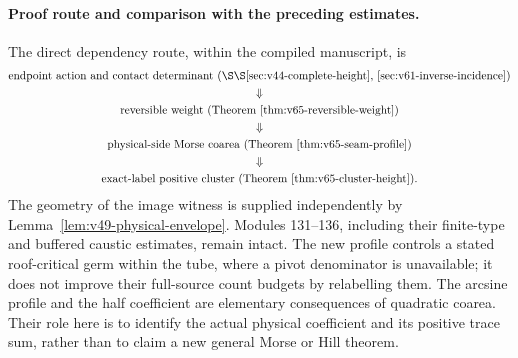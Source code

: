 \paragraph{Proof route and comparison with the preceding estimates.}
The direct dependency route, within the compiled manuscript, is
\[
 \begin{gathered}
 \text{endpoint action and contact determinant (\S\S\ref{sec:v44-complete-height},
                                      \ref{sec:v61-inverse-incidence})}\\
 \Downarrow\\
 \text{reversible weight (Theorem~\ref{thm:v65-reversible-weight})}\\
 \Downarrow\\
 \text{physical-side Morse coarea (Theorem~\ref{thm:v65-seam-profile})}\\
 \Downarrow\\
 \text{exact-label positive cluster (Theorem~\ref{thm:v65-cluster-height}).}
 \end{gathered}
\]
The geometry of the image witness is supplied independently by
Lemma~\ref{lem:v49-physical-envelope}. Modules 131--136, including
their finite-type and buffered caustic estimates, remain intact.
The new profile controls a stated roof-critical germ within the tube,
where a pivot denominator is unavailable; it does not improve their
full-source count budgets by relabelling them. The arcsine profile
and the half coefficient are elementary consequences of quadratic
coarea. Their role here is to identify the actual physical coefficient
and its positive trace sum, rather than to claim a new general Morse
or Hill theorem.
